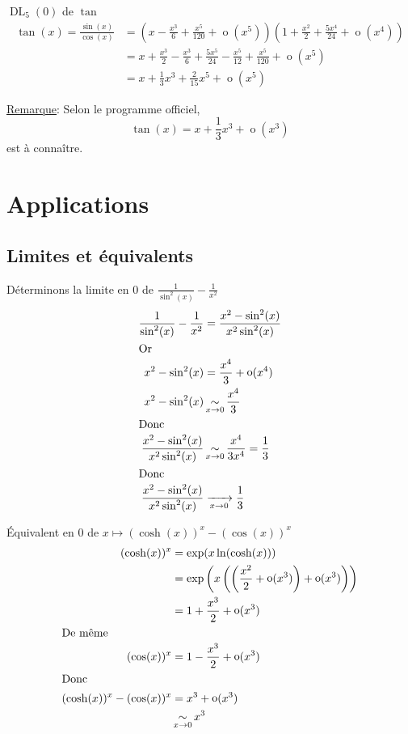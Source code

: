 \documentclass[10pt,a4paper]{article}
\theoremstyle{definition}
\DeclareMathOperator*{\eqv}{\sim}
\DeclareMathOperator*{\negl}{o}
\DeclareMathOperator{\dl}{DL}
\begin{document}
$\dl_5(0)$ de $\tan$
\begin{align*}
\tan(x) = \frac{\sin(x)}{\cos(x)} &= \left(x - \frac{x^3}{6} + \frac{x^5}{120} + \negl(x^5)\right)\left(1 + \frac{x^2}{2} + \frac{5 x^4}{24} + \negl(x^4)\right) \\
&= x + \frac{x^3}{2} - \frac{x^3}{6} + \frac{5 x^5}{24} - \frac{x^5}{12} + \frac{x^5}{120} + \negl(x^5) \\
&= x + \frac{1}{3} x^3 + \frac{2}{15} x^5 + \negl(x^5)
\end{align*} \medskip

\noindent \uline{Remarque}: Selon le programme officiel,
\[\tan(x) = x + \frac{1}{3} x^3 + \negl(x^3)\]
est à connaître.

\section{Applications}
\subsection{Limites et équivalents}
Déterminons la limite en 0 de $\frac{1}{\sin^2(x)} - \frac{1}{x^2}$
\begin{align*}
\frac{1}{\sin^2(x)} - \frac{1}{x^2} &= \frac{x^2 - \sin^2(x)}{x^2 \sin^2(x)} \\
\intertext{Or}
x^2 - \sin^2(x) &= \frac{x^4}{3} + \negl(x^4) \\
x^2 - \sin^2(x) &\eqv\limits_{x \to 0} \frac{x^4}{3} \\
\intertext{Donc}
\frac{x^2 - \sin^2(x)}{x^2 \sin^2(x)} &\eqv\limits_{x \to 0} \frac{x^4}{3 x^4} = \frac{1}{3} \\
\intertext{Donc}
\frac{x^2 - \sin^2(x)}{x^2 \sin^2(x)} &\xrightarrow[x \to 0]{} \frac{1}{3}
\end{align*}

Équivalent en 0 de $x \mapsto (\cosh(x))^x - (\cos(x))^x$
\begin{align*}
(\cosh(x))^x &= \exp(x \ln(\cosh(x))) \\
&= \exp\left(x\left(\left(\frac{x^2}{2} + \negl(x^3)\right) + \negl(x^3)\right)\right) \\
&= 1 + \frac{x^3}{2} + \negl(x^3) \\
\intertext{De même}
(\cos(x))^x &= 1 - \frac{x^3}{2} + \negl(x^3) \\
\intertext{Donc}
(\cosh(x))^x - (\cos(x))^x &= x^3 + \negl(x^3) \\
&\eqv\limits_{x \to 0} x^3
\end{align*}
\end{document}
